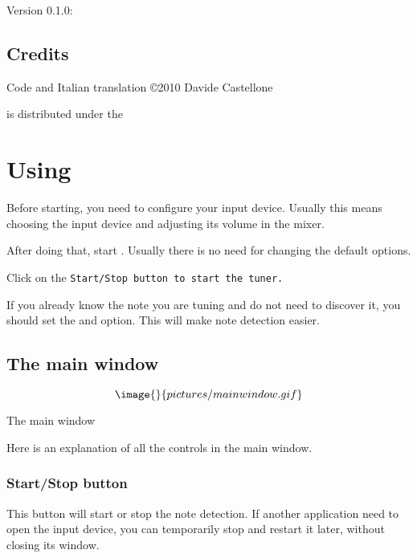Version 0.1.0:


\section{Credits}\label{credits}

Code and Italian translation \copyright 2010 Davide Castellone

 is distributed under the


\chapter{Using }\label{using}

Before starting, you need to configure your input device.
Usually this means choosing the input device and adjusting
its volume in the mixer.

After doing that, start . Usually there is
no need for changing the default options.

Click on the \tt{Start/Stop} button to start the tuner.

If you already know the note you are tuning and do not need to
discover it, you should set the  and
 option.
This will make note detection easier.

\section{The main window}\label{mainwindow}

$$\image{}{pictures/mainwindow.gif}$$
\caption{The main window}

Here is an explanation of all the controls in the main window.

\subsection{Start/Stop button}\label{startstop}

This button will start or stop the note detection. If another
application need to open the input device, you can temporarily
stop  and restart it later, without closing its
window.

